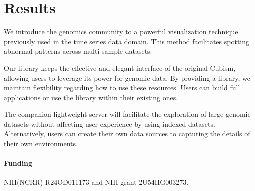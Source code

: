 \documentclass{bioinfo}
\begin{document}
\section{Results}

We introduce the genomics community to a powerful visualization technique
previously used in the time series data domain. This method facilitates
spotting abnormal patterns across multi-sample datasets.

Our library keeps the effective and elegant interface of the original Cubism,
allowing users to leverage its power for genomic data. By providing a
library, we maintain flexibility regarding how to use these resources. Users
can build full applications or use the library within their existing ones.

The companion lightweight server will facilitate the exploration of large
genomic datasets without affecting user experience by using indexed datasets.
Alternatively, users can create their own data sources to capturing the details
of their own environments.




\paragraph{Funding\textcolon} NIH(NCRR) R24OD011173 and NIH grant 2U54HG003273.


\end{document}

